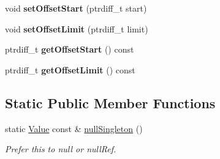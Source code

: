 \begin{DoxyCompactItemize}
void {\bfseries set\+Offset\+Start} (ptrdiff\+\_\+t start)
\item 
\mbox{\label{classJson_1_1Value_a5e4f5853fec138150c5df6004a8c2bcf}} 
void {\bfseries set\+Offset\+Limit} (ptrdiff\+\_\+t limit)
\item 
\mbox{\label{classJson_1_1Value_afa081dc764000951a1d8d6148155508e}} 
ptrdiff\+\_\+t {\bfseries get\+Offset\+Start} () const
\item 
\mbox{\label{classJson_1_1Value_a2cdfa01935f87fcace90d450cbd2c0a4}} 
ptrdiff\+\_\+t {\bfseries get\+Offset\+Limit} () const
\end{DoxyCompactItemize}
\subsection*{Static Public Member Functions}
\begin{DoxyCompactItemize}
\item 
\mbox{\label{classJson_1_1Value_af2f124567acc35d021a424e53ebdfcab}} 
static \hyperlink{classJson_1_1Value}{Value} const  \& \hyperlink{classJson_1_1Value_af2f124567acc35d021a424e53ebdfcab}{null\+Singleton} ()
\begin{DoxyCompactList}\small\item\em Prefer this to null or null\+Ref. \end{DoxyCompactList}\end{DoxyCompactItemize}
